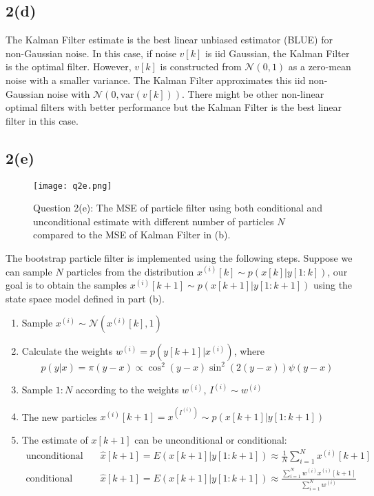 \documentclass[a4paper, 11pt]{article}
\begin{document}
\subsection*{2(d)}

The Kalman Filter estimate is the best linear unbiased estimator (BLUE) for non-Gaussian noise. In this case, if noise $v[k]$ is iid Gaussian, the Kalman Filter is the optimal filter. However, $v[k]$ is constructed from $\mathcal{N}(0,1)$ as a zero-mean noise with a smaller variance. The Kalman Filter approximates this iid non-Gaussian noise with $\mathcal{N}(0, \text{var}(v[k]))$. There might be other non-linear optimal filters with better performance but the Kalman Filter is the best linear filter in this case. 



\subsection*{2(e)}

\begin{figure}
	\begin{center}
		\texttt{[image: q2e.png]}
		\caption{Question 2(e): The MSE of particle filter using both conditional and unconditional estimate with different number of particles $N$ compared to the MSE of Kalman Filter in (b). }
	\end{center}
\end{figure}

The bootstrap particle filter is implemented using the following steps. Suppose we can sample $N$ particles from the distribution $x^{(i)}[k]\sim p(x[k]|y[1:k])$, our goal is to obtain the samples $x^{(i)}[k+1]\sim p(x[k+1]|y[1:k+1])$ using the state space model defined in part (b).
\begin{enumerate}
\item Sample $x^{(i)} \sim \mathcal{N}(x^{(i)}[k], 1)$
\item Calculate the weights $w^{(i)} = p(y[k+1]|x^{(i)})$, where 
\begin{equation}
p(y|x) = \pi(y-x) \propto \cos^2(y-x)\sin^2(2(y-x))\psi(y-x)
\end{equation} 
\item Sample $1:N$ according to the weights $w^{(i)}$, $I^{(i)}\sim w^{(i)}$
\item The new particles $x^{(i)}[k+1] = x^{(I^{(i)})} \sim p(x[k+1]|y[1:k+1])$
\item The estimate of $x[k+1]$ can be unconditional or conditional:
\begin{equation}
\begin{split}
\text{unconditional} & \quad\hat{x}[k+1] = E(x[k+1]|y[1:k+1]) \approx \frac{1}{N}\sum_{i=1}^N x^{(i)}[k+1]\\
\text{conditional} & \quad\hat{x}[k+1] = E(x[k+1]|y[1:k+1]) \approx \frac{\sum_{i=1}^N w^{(i)}x^{(i)}[k+1]}{\sum_{i=1}^N w^{(i)}}\\
\end{split}
\end{equation} 
\end{enumerate}
\end{document}
